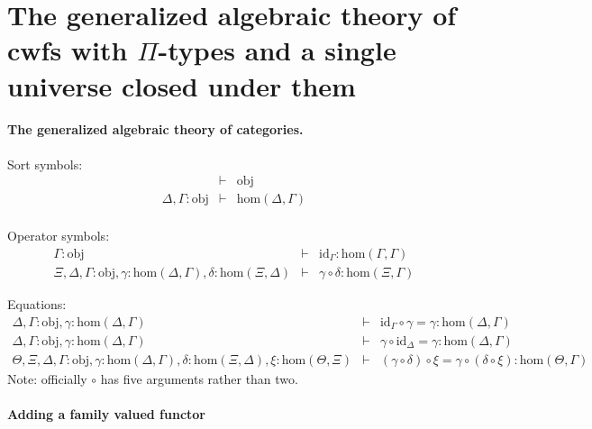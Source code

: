 \documentclass[11pt,a4paper]{article}
\theoremstyle{definition}
\newcommand{\id}{\mathsf{id}}
\def\Obj{\mathrm{obj}}
\def\Hom{\mathrm{hom}}
\def\id{\mathrm{id}}
\begin{document}
\section{The generalized algebraic theory of cwfs with $\Pi$-types and a single universe closed under them}\label{sec:gatPiU}

\paragraph{The generalized algebraic theory of categories.}
\begin{tiny}
Sort symbols:
\begin{eqnarray*}
&\vdash& \Obj\\
\Delta, \Gamma : \Obj &\vdash& \Hom(\Delta,\Gamma)\\
\end{eqnarray*}

Operator symbols:
\begin{eqnarray*}
\Gamma : \Obj &\vdash& \id_\Gamma : \Hom(\Gamma,\Gamma)\\
\Xi,\Delta,\Gamma : \Obj, \gamma : \Hom(\Delta,\Gamma), \delta : \Hom(\Xi,\Delta) &\vdash&
\gamma \circ \delta : \Hom(\Xi,\Gamma)
\end{eqnarray*}

Equations:
\begin{eqnarray*}
\Delta, \Gamma : \Obj, \gamma : \Hom(\Delta,\Gamma) &\vdash& \id_\Gamma \circ \gamma = \gamma : \Hom(\Delta,\Gamma)\\
\Delta, \Gamma : \Obj, \gamma : \Hom(\Delta,\Gamma) &\vdash& \gamma \circ \id_\Delta = \gamma : \Hom(\Delta,\Gamma)\\
\Theta, \Xi,\Delta,\Gamma : \Obj, \gamma : \Hom(\Delta,\Gamma), \delta : \Hom(\Xi,\Delta), \xi : \Hom(\Theta,\Xi) &\vdash&
(\gamma \circ \delta) \circ \xi = \gamma \circ (\delta \circ \xi): \Hom(\Theta,\Gamma)
\end{eqnarray*}
Note: officially $\circ$ has five arguments rather than two.
\end{tiny}

\paragraph{Adding a family valued functor}
\end{document}
